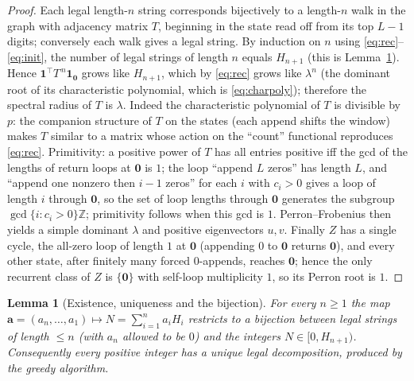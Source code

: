 \documentclass[12pt]{article}
\newtheorem{lemma}{Lemma}
\theoremstyle{definition}
\newcommand{\Z}{\mathbb{Z}}
\newcommand{\one}{\mathbf{1}}
\begin{document}
\begin{proof}
Each legal length-$n$ string corresponds bijectively to a length-$n$ walk in the
graph with adjacency matrix $T$, beginning in the state read off from its top
$L-1$ digits; conversely each walk gives a legal string. By induction on $n$
using \eqref{eq:rec}--\eqref{eq:init}, the number of legal strings of length $n$
equals $H_{n+1}$ (this is Lemma~\ref{lem:bij}). Hence
$\one^\top T^{\,n}\one_{\mathbf 0}$ grows like $H_{n+1}$, which by \eqref{eq:rec}
grows like $\lambda^{n}$ (the dominant root of its characteristic polynomial,
which is \eqref{eq:charpoly}); therefore the spectral radius of $T$ is $\lambda$.
Indeed the characteristic polynomial of $T$ is divisible by $p$: the companion
structure of $T$ on the states (each append shifts the window) makes $T$
similar to a matrix whose action on the ``count'' functional reproduces
\eqref{eq:rec}. Primitivity: a positive power of $T$ has all entries positive iff
the gcd of the lengths of return loops at $\mathbf 0$ is $1$; the loop
``append $L$ zeros'' has length $L$, and ``append one nonzero then $i-1$ zeros''
for each $i$ with $c_i>0$ gives a loop of length $i$ through $\mathbf0$, so the
set of loop lengths through $\mathbf 0$ generates the subgroup
$\gcd\{i:c_i>0\}\Z$; primitivity follows when this gcd is $1$. Perron--Frobenius
then yields a simple dominant $\lambda$ and positive eigenvectors $u,v$. Finally
$Z$ has a single cycle, the all-zero loop of length $1$ at $\mathbf 0$
(appending $0$ to $\mathbf 0$ returns $\mathbf 0$), and every other state, after
finitely many forced $0$-appends, reaches $\mathbf0$; hence the only recurrent
class of $Z$ is $\{\mathbf 0\}$ with self-loop multiplicity $1$, so its Perron
root is $1$.
\end{proof}

\begin{lemma}[Existence, uniqueness and the bijection]\label{lem:bij}
For every $n\ge1$ the map
$\mathbf a=(a_n,\dots,a_1)\mapsto N=\sum_{i=1}^n a_iH_i$ restricts to a bijection
between legal strings of length $\le n$ (with $a_n$ allowed to be $0$) and the
integers $N\in[0,H_{n+1})$. Consequently every positive integer has a unique
legal decomposition, produced by the greedy algorithm.
\end{lemma}
\end{document}

